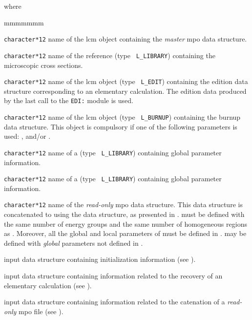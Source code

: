 \noindent where
\begin{ListeDeDescription}{mmmmmmm}

\item[\dusa{MPONAM}] {\tt character*12} name of the {\sc lcm} object containing the
{\sl master} {\sc mpo} data structure.

\item[\dusa{HMIC}] {\tt character*12} name of the reference  (type {\tt
L\_LIBRARY}) containing the microscopic cross sections.

\item[\dusa{EDINAM}] {\tt character*12} name of the {\sc lcm} object (type {\tt
L\_EDIT}) containing the {\sc edition} data structure corresponding to an elementary
calculation. The {\sc edition} data produced by the last call to the {\tt EDI:} module
is used.

\item[\dusa{BRNNAM}] {\tt character*12} name of the {\sc lcm} object (type {\tt
L\_BURNUP}) containing the {\sc burnup} data structure. This object is compulsory if one
of the following parameters is used: ,  and/or .

\item[\dusa{HMIC1}] {\tt character*12} name of a  (type {\tt
L\_LIBRARY}) containing global parameter information.

\item[\dusa{HMIC2}] {\tt character*12} name of a  (type {\tt
L\_LIBRARY}) containing global parameter information.

\item[\dusa{MPORHS}] {\tt character*12} name of the {\sl read-only} {\sc mpo} data structure. This
data structure is concatenated to  using the  data structure,
as presented in .  must be defined with the same number of energy
groups and the same number of homogeneous regions as . Moreover, all the
global and local parameters of  must be defined in . 
may be defined with {\sl global} parameters not defined in .

\item[\dusa{mpo\_data1}] input data structure containing initialization information (see ).

\item[\dusa{mpo\_data2}] input data structure containing information related to the recovery of an
elementary calculation (see ).

\item[\dusa{mpo\_data3}] input data structure containing information related to the catenation of a
{\sl read-only} {\sc mpo} file (see ).

\end{ListeDeDescription}

